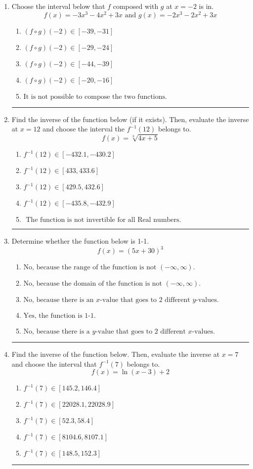 \documentclass[14pt]{extbook}
\newcommand{\litem}[1]{\item#1\hspace*{-1cm}\rule{\textwidth}{0.4pt}}
\begin{document}
\begin{enumerate}
{\begin{enumerate}[label=\Alph*.]
\end{enumerate} }
\litem{
Choose the interval below that $f$ composed with $g$ at $x=-2$ is in.\[ f(x) = -3x^{3} -4 x^{2} +3 x \text{ and } g(x) = -2x^{3} -2 x^{2} +3 x \]\begin{enumerate}[label=\Alph*.]
\item \( (f \circ g)(-2) \in [-39, -31] \)
\item \( (f \circ g)(-2) \in [-29, -24] \)
\item \( (f \circ g)(-2) \in [-44, -39] \)
\item \( (f \circ g)(-2) \in [-20, -16] \)
\item \( \text{It is not possible to compose the two functions.} \)

\end{enumerate} }
\litem{
Find the inverse of the function below (if it exists). Then, evaluate the inverse at $x = 12$ and choose the interval the $f^{-1}(12)$ belongs to.\[ f(x) = \sqrt[3]{4 x + 5} \]\begin{enumerate}[label=\Alph*.]
\item \( f^{-1}(12) \in [-432.1, -430.2] \)
\item \( f^{-1}(12) \in [433, 433.6] \)
\item \( f^{-1}(12) \in [429.5, 432.6] \)
\item \( f^{-1}(12) \in [-435.8, -432.9] \)
\item \( \text{ The function is not invertible for all Real numbers. } \)

\end{enumerate} }
\litem{
Determine whether the function below is 1-1.\[ f(x) = (5 x + 30)^3 \]\begin{enumerate}[label=\Alph*.]
\item \( \text{No, because the range of the function is not $(-\infty, \infty)$.} \)
\item \( \text{No, because the domain of the function is not $(-\infty, \infty)$.} \)
\item \( \text{No, because there is an $x$-value that goes to 2 different $y$-values.} \)
\item \( \text{Yes, the function is 1-1.} \)
\item \( \text{No, because there is a $y$-value that goes to 2 different $x$-values.} \)

\end{enumerate} }
\litem{
Find the inverse of the function below. Then, evaluate the inverse at $x = 7$ and choose the interval that $f^{-1}(7)$ belongs to.\[ f(x) = \ln{(x-3)}+2 \]\begin{enumerate}[label=\Alph*.]
\item \( f^{-1}(7) \in [145.2, 146.4] \)
\item \( f^{-1}(7) \in [22028.1, 22028.9] \)
\item \( f^{-1}(7) \in [52.3, 58.4] \)
\item \( f^{-1}(7) \in [8104.6, 8107.1] \)
\item \( f^{-1}(7) \in [148.5, 152.3] \)

\end{enumerate} }
\end{enumerate}
\end{document}
